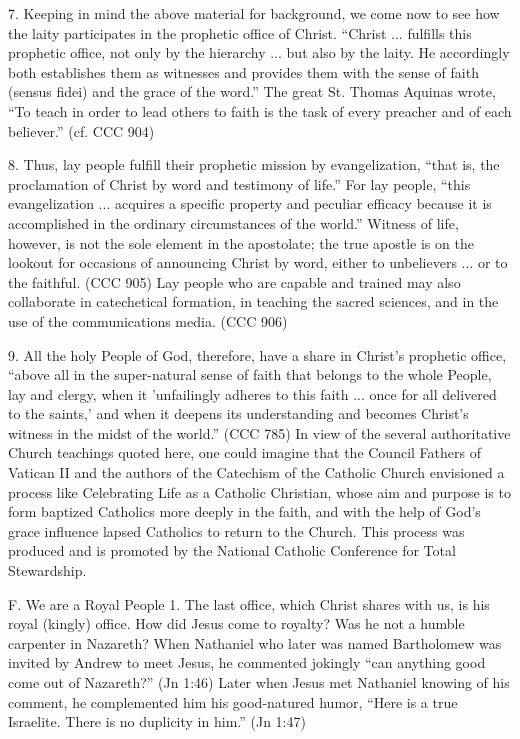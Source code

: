 \documentclass[oneside]{book}
\begin{document}
7. Keeping in mind the above material for background, we come now to see how the
laity participates in the prophetic office of Christ. ``Christ ... fulfills this
prophetic office, not only by the hierarchy ... but also by the laity. He
accordingly both establishes them as witnesses and provides them with the sense
of faith (sensus fidei) and the grace of the word.'' The great St. Thomas
Aquinas wrote, ``To teach in order to lead others to faith is the task of every
preacher and of each believer.'' (cf. CCC 904)

8. Thus, lay people fulfill their prophetic mission by evangelization, ``that
is, the proclamation of Christ by word and testimony of life.'' For lay people,
``this evangelization ... acquires a specific property and peculiar efficacy
because it is accomplished in the ordinary circumstances of the world.'' Witness
of life, however, is not the sole element in the apostolate; the true apostle is
on the lookout for occasions of announcing Christ by word, either to unbelievers
... or to the faithful. (CCC 905) Lay people who are capable and trained may
also collaborate in catechetical formation, in teaching the sacred sciences, and
in the use of the communications media. (CCC 906)

9. All the holy People of God, therefore, have a share in Christ's prophetic
office, ``above all in the super-natural sense of faith that belongs to the
whole People, lay and clergy, when it 'unfailingly adheres to this faith
... once for all delivered to the saints,' and when it deepens its understanding
and becomes Christ's witness in the midst of the world.'' (CCC 785)
In view of the several authoritative Church teachings quoted here, one could
imagine that the Council Fathers of Vatican II and the authors of the Catechism
of the Catholic Church envisioned a process like Celebrating Life as a Catholic
Christian, whose aim and purpose is to form baptized Catholics more deeply in
the faith, and with the help of God's grace influence lapsed Catholics to return
to the Church. This process was produced and is promoted by the National
Catholic Conference for Total Stewardship.

F. We are a Royal People
1. The last office, which Christ shares with us, is his royal (kingly)
office. How did Jesus come to royalty? Was he not a humble carpenter in
Nazareth? When Nathaniel who later was named Bartholomew was invited by Andrew
to meet Jesus, he commented jokingly ``can anything good come out of Nazareth?''
(Jn 1:46) Later when Jesus met Nathaniel knowing of his comment, he complemented
him his good-natured humor, ``Here is a true Israelite. There is no duplicity in
him.'' (Jn 1:47)
\end{document}
